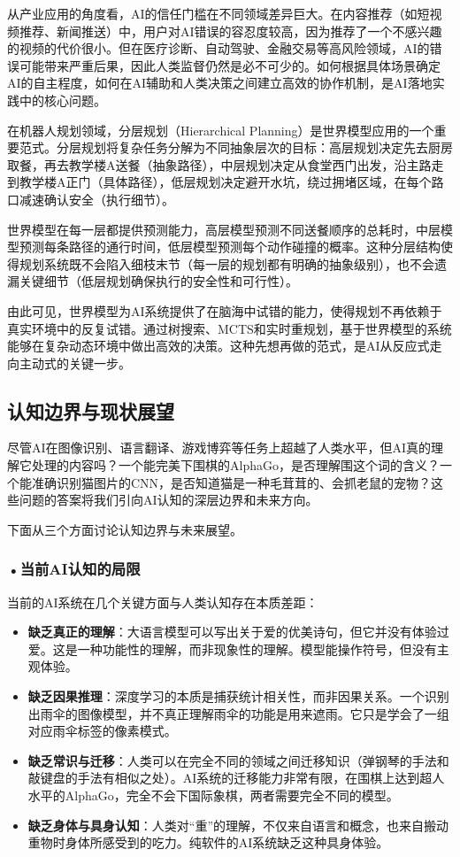 从产业应用的角度看，AI的信任门槛在不同领域差异巨大。在内容推荐（如短视频推荐、新闻推送）中，用户对AI错误的容忍度较高，因为推荐了一个不感兴趣的视频的代价很小。但在医疗诊断、自动驾驶、金融交易等高风险领域，AI的错误可能带来严重后果，因此人类监督仍然是必不可少的。如何根据具体场景确定AI的自主程度，如何在AI辅助和人类决策之间建立高效的协作机制，是AI落地实践中的核心问题。

在机器人规划领域，分层规划（Hierarchical Planning）是世界模型应用的一个重要范式。分层规划将复杂任务分解为不同抽象层次的目标：高层规划决定先去厨房取餐，再去教学楼A送餐（抽象路径），中层规划决定从食堂西门出发，沿主路走到教学楼A正门（具体路径），低层规划决定避开水坑，绕过拥堵区域，在每个路口减速确认安全（执行细节）。

世界模型在每一层都提供预测能力，高层模型预测不同送餐顺序的总耗时，中层模型预测每条路径的通行时间，低层模型预测每个动作碰撞的概率。这种分层结构使得规划系统既不会陷入细枝末节（每一层的规划都有明确的抽象级别），也不会遗漏关键细节（低层规划确保执行的安全性和可行性）。

由此可见，世界模型为AI系统提供了在脑海中试错的能力，使得规划不再依赖于真实环境中的反复试错。通过树搜索、MCTS和实时重规划，基于世界模型的系统能够在复杂动态环境中做出高效的决策。这种先想再做的范式，是AI从反应式走向主动式的关键一步。



\subsection{认知边界与现状展望}
尽管AI在图像识别、语言翻译、游戏博弈等任务上超越了人类水平，但AI真的理解它处理的内容吗？一个能完美下围棋的AlphaGo，是否理解围这个词的含义？一个能准确识别猫图片的CNN，是否知道猫是一种毛茸茸的、会抓老鼠的宠物？这些问题的答案将我们引向AI认知的深层边界和未来方向。

下面从三个方面讨论认知边界与未来展望。

\subsubsection*{\textbf{•当前AI认知的局限}}

当前的AI系统在几个关键方面与人类认知存在本质差距：
\begin{itemize}
\item \textbf{缺乏真正的理解}：大语言模型可以写出关于爱的优美诗句，但它并没有体验过爱。这是一种功能性的理解，而非现象性的理解。模型能操作符号，但没有主观体验。
\item \textbf{缺乏因果推理}：深度学习的本质是捕获统计相关性，而非因果关系。一个识别出雨伞的图像模型，并不真正理解雨伞的功能是用来遮雨。它只是学会了一组对应雨伞标签的像素模式。
\item \textbf{缺乏常识与迁移}：人类可以在完全不同的领域之间迁移知识（弹钢琴的手法和敲键盘的手法有相似之处）。AI系统的迁移能力非常有限，在围棋上达到超人水平的AlphaGo，完全不会下国际象棋，两者需要完全不同的模型。
\item \textbf{缺乏身体与具身认知}：人类对“重”的理解，不仅来自语言和概念，也来自搬动重物时身体所感受到的吃力。纯软件的AI系统缺乏这种具身体验。
\end{itemize}




